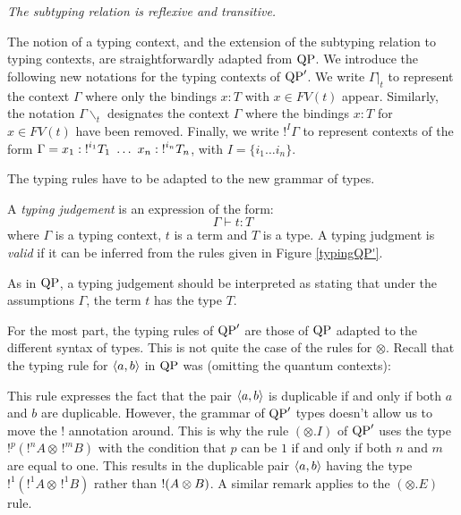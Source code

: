 \begin{proposition} \it The subtyping relation is reflexive and transitive.
\end{proposition}

The notion of a typing context, and the extension of the subtyping relation to typing contexts, are straightforwardly adapted from ${\rm QP}$. We introduce the following new notations for the typing contexts of ${\rm QP}'$. We write $\Gamma|_t$ to represent the context $\Gamma$ where only the bindings $x : T$ with $x \in FV(t)$ appear. Similarly, the notation $\Gamma \backslash_t$ designates the context $\Gamma$ where the bindings $x : T$ for $x \in FV(t)$ have been removed. Finally, we write $!^I \Gamma$ to represent contexts of the form $\Gamma = x_1 : {!}^{i_1} T_1 ~ \dots ~ x_n : {!}^{i_n} T_n$, with $I = \{i_1 \dots i_n\}$.

The typing rules have to be adapted to the new grammar of types.

\begin{defn}
A \emph{typing judgement} is an expression of the form:
\[
\Gamma \vdash t:T
\] 
where $\Gamma$ is a typing context, $t$ is a term and $T$ is a type. A typing judgment is \emph{valid} if it can be inferred from the rules given in Figure \ref{typingQP'}.
\end{defn}

As in ${\rm QP}$, a typing judgement should be interpreted as stating that under the assumptions $\Gamma$, the term $t$ has the type $T$. 

\begin{remark} For the most part, the typing rules of ${\rm QP}'$ are those of ${\rm QP}$ adapted to the different syntax of types. This is not quite the 
	case of the rules for $\otimes$. Recall that the typing rule for $\langle a, b \rangle$ in ${\rm QP}$ was (omitting the quantum contexts):
		\begin{prooftree}
		\end{prooftree}
	This rule expresses the fact that the pair $\langle a, b \rangle$ is duplicable if and only if both $a$ and $b$ are duplicable. However, the grammar of 
	${\rm QP}'$ types doesn't allow us to move the $!$ annotation around. This is why the rule $(\otimes.I)$ of ${\rm QP}'$ uses the type 
	$!^p(!^nA \otimes \,!^mB)$ with the condition that $p$ can be $1$ if and only if both $n$ and $m$ are equal to one. This results in 
	the duplicable pair $\langle a, b \rangle$ having the type $!^1(!^1 A \otimes \,!^1B)$ rather than ${!} (A \otimes B)$. A similar remark applies 
	to the $(\otimes.E)$ rule.
\end{remark}

